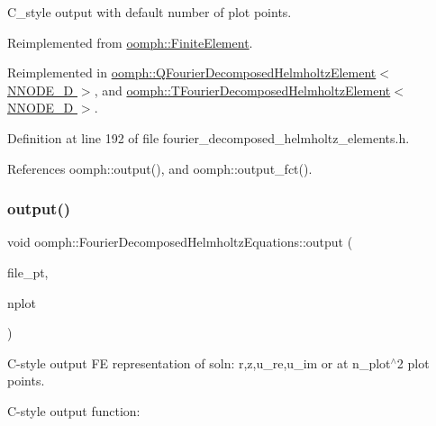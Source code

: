 C\+\_\+style output with default number of plot points. 



Reimplemented from \hyperlink{classoomph_1_1FiniteElement_a72cddd09f8ddbee1a20a1ff404c6943e}{oomph\+::\+Finite\+Element}.



Reimplemented in \hyperlink{classoomph_1_1QFourierDecomposedHelmholtzElement_a36f0992d35d4f19d2d9cf3070b49bba1}{oomph\+::\+Q\+Fourier\+Decomposed\+Helmholtz\+Element$<$ N\+N\+O\+D\+E\+\_\+D $>$}, and \hyperlink{classoomph_1_1TFourierDecomposedHelmholtzElement_a5ff9eff472598398a2f31c30ff478e7d}{oomph\+::\+T\+Fourier\+Decomposed\+Helmholtz\+Element$<$ N\+N\+O\+D\+E\+\_\+D $>$}.



Definition at line 192 of file fourier\+\_\+decomposed\+\_\+helmholtz\+\_\+elements.\+h.



References oomph\+::output(), and oomph\+::output\+\_\+fct().

\mbox{\label{classoomph_1_1FourierDecomposedHelmholtzEquations_a1cd04195d40d3d411cda8f0323fc2e7b}} 
\subsubsection{\texorpdfstring{output()}{output()}\hspace{0.1cm}{\footnotesize\ttfamily [4/4]}}
{\footnotesize\ttfamily void oomph\+::\+Fourier\+Decomposed\+Helmholtz\+Equations\+::output (\begin{DoxyParamCaption}\item[{F\+I\+LE $\ast$}]{file\+\_\+pt,  }\item[{const unsigned \&}]{nplot }\end{DoxyParamCaption})\hspace{0.3cm}{\ttfamily [virtual]}}



C-\/style output FE representation of soln\+: r,z,u\+\_\+re,u\+\_\+im or at n\+\_\+plot$^\wedge$2 plot points. 

C-\/style output function\+:

